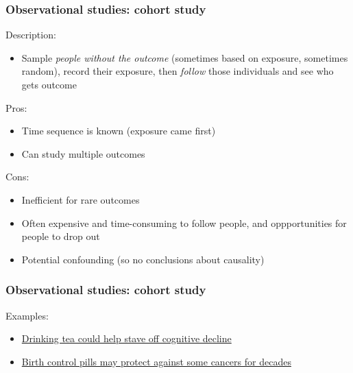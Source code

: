 \documentclass[12pt, 
hyperref={colorlinks=true, linkcolor=blue, urlcolor=cyan}]{beamer}
\begin{document}
\begin{frame}
\frametitle{Observational studies: cohort study}
Description: \vspace{-0.3cm}
\begin{itemize}
\item Sample \textit{people without the outcome} (sometimes based on exposure, sometimes random), record their exposure, then \textit{follow} those individuals and see who gets outcome %
\end{itemize}

\pause
Pros:\vspace{-0.3cm}
\begin{itemize}
\item Time sequence is known (exposure came first)
\item Can study multiple outcomes 
\end{itemize}

\pause
Cons:\vspace{-0.3cm}
\begin{itemize}
\item Inefficient for rare outcomes %
\item Often expensive and time-consuming to follow people, and oppportunities for people to drop out
\item Potential confounding (so no conclusions about causality)
\end{itemize}
\end{frame}

\begin{frame}
\frametitle{Observational studies: cohort study}
Examples:
\begin{itemize}
\item \href{https://www.medicalnewstoday.com/articles/316619.php}{Drinking tea could help stave off cognitive decline}
\item \href{https://www.medicalnewstoday.com/articles/316565.php}{Birth control pills may protect against some cancers for decades}
\end{itemize}
\end{frame}
\end{document}
